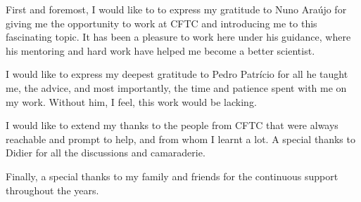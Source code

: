 \documentclass[../../main.tex]{subfiles}
\begin{document}
%
    First and foremost, I would like to to express my gratitude to Nuno Araújo for giving me the opportunity to work at CFTC and introducing me to this fascinating topic. It has been a pleasure to work here under his guidance, where his mentoring and hard work have helped me become a better scientist.
    
    I would like to express my deepest gratitude to Pedro Patrício for all he taught me, the advice, and most importantly, the time and patience spent with me on my work. Without him, I feel, this work would be lacking. 
    
    I would like to extend my thanks to the people from CFTC that were always reachable and prompt to help, and from whom I learnt a lot. A special thanks to Didier for all the discussions and camaraderie.
    
    Finally, a special thanks to my family and friends for the continuous support throughout the years.
\end{document}
